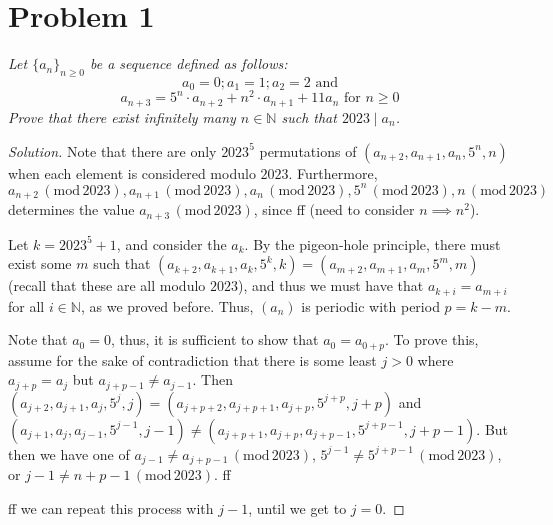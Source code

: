 \documentclass{article}
\newcommand{\N}{{\mathbb N}}
\begin{document}
\section{Problem 1}
{\it Let $\{a_n\}_{n\geq 0}$ be a sequence defined as follows:
\[
	a_0 = 0; a_1 = 1; a_2 = 2 \text{ and}
\]
\[
	a_{n+3} = 5^n\cdot a_{n+2} + n^2\cdot a_{n+1} + 11a_n
	\text{ for }n\geq 0
\]
Prove that there exist infinitely many $n \in \N$
such that $2023 \mid a_n$.
}
\begin{proof}[Solution]\let\qed\relax
	Note that there are only $2023^5$ permutations of
	$(a_{n+2}, a_{n+1}, a_{n}, 5^n, n)$ when each element
	is considered modulo $2023$.
	Furthermore, $a_{n+2}\,(\mathrm{mod}\,2023), a_{n+1}\,(\mathrm{mod}\,2023),
	a_{n}\,(\mathrm{mod}\,2023), 5^n\,(\mathrm{mod}\,2023), n\,(\mathrm{mod}\,2023)$
	determines the value $a_{n+3}\,(\mathrm{mod}\,2023)$,
	since ff (need to consider $n \implies n^2$).

	Let $k = 2023^5 + 1$, and consider the $a_k$.
	By the pigeon-hole principle, there must exist some $m$ such that
	$(a_{k+2},a_{k+1},a_{k},5^k,k) = (a_{m+2},a_{m+1},a_{m},5^m,m)$
	(recall that these are all modulo $2023$),
	and thus we must have that $a_{k+i} = a_{m+i}$ for all $i \in \N$,
	as we proved before.
	Thus, $(a_n)$ is periodic with period $p = k - m$.

	Note that $a_0 = 0$, thus, it is sufficient to show that
	$a_0 = a_{0+p}$.
	To prove this, assume for the sake of contradiction that there
	is some least $j > 0$ where $a_{j+p} = a_j$ but $a_{j+p-1} \neq a_{j-1}$.
	Then $(a_{j+2}, a_{j+1}, a_{j}, 5^j, j) =
	(a_{j+p+2}, a_{j+p+1}, a_{j+p}, 5^{j+p}, j+p)$
	and $(a_{j+1}, a_{j}, a_{j-1}, 5^{j-1}, j-1) \neq
	(a_{j+p+1}, a_{j+p}, a_{j+p-1}, 5^{j+p-1}, j+p-1)$.
	But then we have one of $a_{j-1} \neq a_{j+p-1} \,(\mathrm{mod}\,2023)$,
	$5^{j-1} \neq 5^{j+p-1} \,(\mathrm{mod}\,2023)$,
	or $j-1 \neq n+p-1 \,(\mathrm{mod}\,2023)$.
	ff

	ff we can repeat this process with $j-1$, until we get to $j=0$.
\end{proof}
\clearpage
\end{document}
